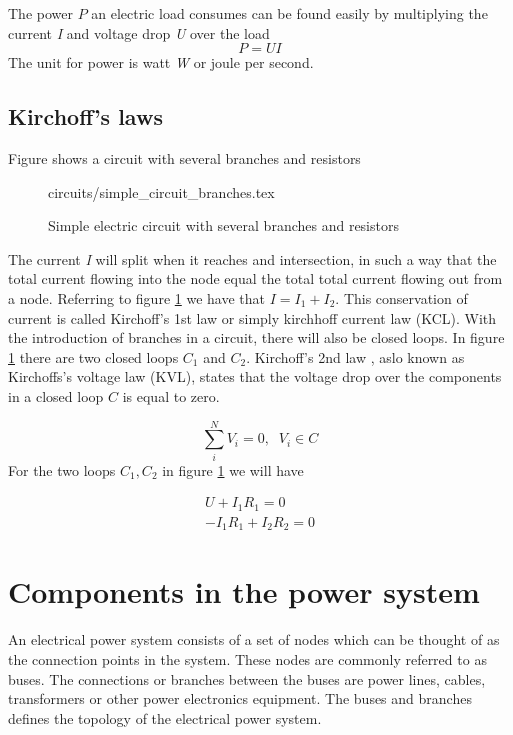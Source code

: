 \documentclass[class=book, crop=false]{standalone}
\begin{document}
The power $P$ an electric load consumes can be found easily by multiplying the current \textit{I} and voltage drop \textit{U} over the load
\begin{equation}\label{eq:theory:simple_powerflow}
    P = UI
\end{equation}
The unit for power is watt \textit{W} or joule per second.

\subsection{Kirchoff's laws}
Figure shows a circuit with several branches and resistors 

\begin{figure}[ht!]
    \centering
    {circuits/simple_circuit_branches.tex}
    \caption{Simple electric circuit with several branches and resistors}
    \label{fig:theory:simple_circuit_branches}
\end{figure}

The current \textit{I} will split when it reaches and intersection, in such a way that the total current flowing into the node equal the total total current flowing out from a node. Referring to figure \ref{fig:theory:simple_circuit_branches} we have that $I = I_1 + I_2$. This conservation of current is called Kirchoff's 1st law or simply kirchhoff current law (KCL). With the introduction of branches in a circuit, there will also be closed loops. In figure \ref{fig:theory:simple_circuit_branches} there are two closed loops $C_{1}$ and $C_{2}$. Kirchoff's 2nd law , aslo known as Kirchoffs's voltage law (KVL), states that the voltage drop over the components in a closed loop $C$ is equal to zero. 

\begin{equation}\label{eq:theory:kirchoffs_2nd_integral}
    \sum_{i}^{N} V_{i} = 0, \;\; V_{i} \in C
\end{equation}
For the two loops $C_1,C_2$ in figure \ref{fig:theory:simple_circuit_branches} we will have 


\begin{equation}
   \begin{aligned}\label{eq:theory:krirchoffs_2nd_ex}
    U + I_{1}R_{1} = 0 
    \\
    -I_{1}R_{1} + I_{2}R_{2} = 0
\end{aligned} 
\end{equation}




\section{Components in the power system}
An electrical power system consists of a set of nodes which can be thought of as the connection points in the system. These nodes are commonly referred to as buses. The connections or branches between the buses are power lines, cables, transformers or other power electronics equipment. The buses and branches defines the topology of the electrical power system. 
\end{document}
